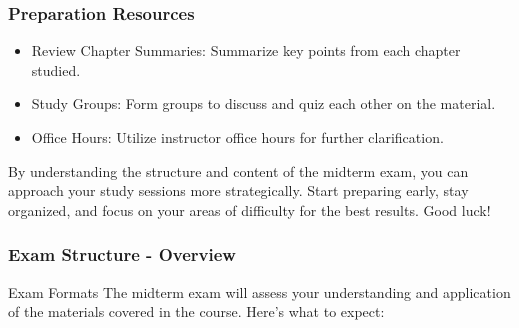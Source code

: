 \documentclass[aspectratio=169]{beamer}
\begin{document}
\begin{frame}[fragile]
    \frametitle{Preparation Resources}
    \begin{itemize}
        \item Review Chapter Summaries: Summarize key points from each chapter studied.
        \item Study Groups: Form groups to discuss and quiz each other on the material.
        \item Office Hours: Utilize instructor office hours for further clarification.
    \end{itemize}
   
    By understanding the structure and content of the midterm exam, you can approach your study sessions more strategically. Start preparing early, stay organized, and focus on your areas of difficulty for the best results. Good luck!
\end{frame}

\begin{frame}[fragile]
    \frametitle{Exam Structure - Overview}
    \begin{block}{Exam Formats}
        The midterm exam will assess your understanding and application of the materials covered in the course. Here’s what to expect:
    \end{block}
\end{frame}
\end{document}
